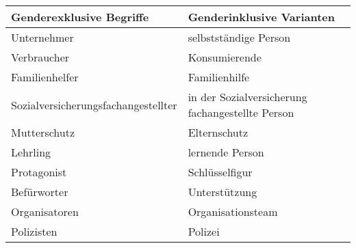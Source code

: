 
\begin{tabular}{ll}
\toprule
Genderexklusive Begriffe & Genderinklusive Varianten\\
\midrule
Unternehmer & selbstständige Person\\
Verbraucher & Konsumierende\\
Familienhelfer & Familienhilfe\\
Sozialversicherungsfachangestellter & in der Sozialversicherung fachangestellte Person\\
Mutterschutz & Elternschutz\\
Lehrling & lernende Person\\
Protagonist & Schlüsselfigur\\
Befürworter & Unterstützung\\
Organisatoren & Organisationsteam\\
Polizisten & Polizei\\
\bottomrule
\end{tabular}